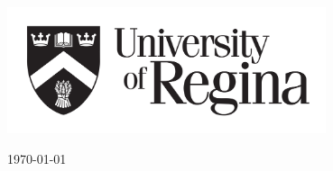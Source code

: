 \begin{titlepage}
	
	\vfill\vfill\vfill\vfill
	\includegraphics[width=0.7\textwidth]{UR.png}\\[2cm] %
	 

	
	\vfill\vfill\vfill %
	
	{\large\today} %
	
	
	\vfill %
	
\end{titlepage}



\newpage 
\tableofcontents

\newpage
\listoffigures


\newpage
